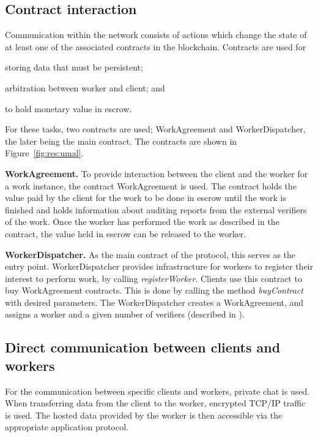 \subsection{Contract interaction}
\label{sec:res:contract}
Communication within the network consists of actions which change the state of at least one of the associated contracts in the blockchain. Contracts are used for
\begin{inparaenum}
\item storing data that must be persistent;
\item arbitration between worker and client; and
\item to hold monetary value in escrow.
\end{inparaenum}
For these tasks, two contracts are used; WorkAgreement and WorkerDispatcher, the later being the main contract. The contracts are shown in Figure~\ref{fig:res:umal}.

\textbf{WorkAgreement.} To provide interaction between the client and the worker for a work instance, the contract WorkAgreement is used. The contract holds the value paid by the client for the work to be done in escrow until the work is finished and holds information about auditing reports from the external verifiers of the work. Once the worker has performed the work as described in the contract, the value held in escrow can be released to the worker.

\textbf{WorkerDispatcher.} As the main contract of the protocol, this serves as the entry point. WorkerDispatcher provides infrastructure for workers to register their interest to perform work, by calling \textit{registerWorker}. Clients use this contract to buy WorkAgreement contracts. This is done by calling the method \textit{buyContract} with desired parameters. The WorkerDispatcher creates a WorkAgreement, and assigns a worker and a given number of verifiers (described in ).

\subsection{Direct communication between clients and workers}
For the communication between specific clients and workers, private chat is used. When transferring data from the client to the worker, encrypted TCP/IP traffic is used. The hosted data provided by the worker is then accessible via the appropriate application protocol.

